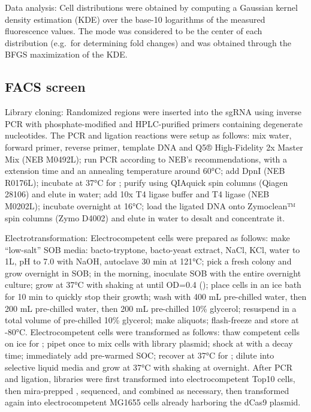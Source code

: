 \documentclass[10pt,oneside]{article}
\begin{document}
Data analysis: Cell distributions were obtained by computing a Gaussian kernel 
density estimation (KDE) over the base-10 logarithms of the measured 
fluorescence values.  The mode was considered to be the center of each 
distribution (e.g.\ for determining fold changes) and was obtained through the 
BFGS maximization of the KDE.

\subsection{FACS screen}

Library cloning: Randomized regions were inserted into the sgRNA using inverse 
PCR with phosphate-modified and HPLC-purified primers containing degenerate 
nucleotides.  The PCR and ligation reactions were setup as follows: mix 
 water,   forward primer,   reverse 
primer,   template DNA and  Q5® High-Fidelity 2x 
Master Mix (NEB M0492L); run PCR according to NEB's recommendations, with a 
 extension time and an annealing temperature around 60°C; add  
 DpnI (NEB R0176L); incubate at 37°C for ; purify using QIAquick 
spin columns (Qiagen 28106) and elute in  water; add  10x T4 
ligase buffer and   T4 ligase (NEB M0202L); incubate overnight 
at 16°C; load the ligated DNA onto Zymoclean™ spin columns (Zymo D4002) and 
elute in  water to desalt and concentrate it.

Electrotransformation: Electrocompetent cells were prepared as follows: make 
``low-salt'' SOB media:  bacto-tryptone,  bacto-yeast extract, 
  NaCl,   KCl, water to 1L, pH to 7.0 with 
NaOH, autoclave 30 min at 121°C; pick a fresh colony and grow overnight in 
 SOB; in the morning, inoculate  SOB with the entire overnight 
culture; grow at 37°C with shaking at  until OD=0.4 (); place 
cells in an ice bath for 10 min to quickly stop their growth; wash with 400 mL 
pre-chilled water, then 200 mL pre-chilled water, then 200 mL pre-chilled 10\% 
glycerol; resuspend in a total volume of  pre-chilled 10\% glycerol; make 
 aliquots; flash-freeze and store at -80°C.  Electrocompetent cells 
were transformed as follows: thaw competent cells on ice for ; pipet 
once to mix cells with   library plasmid; shock at 
with a  decay time; immediately add  pre-warmed SOC; recover at 
37°C for ; dilute into selective liquid media and grow at 37°C with 
shaking at  overnight.  After PCR and ligation, libraries were first 
transformed into electrocompetent Top10 cells, then mira-prepped 
\autocite{pronobis2016}, sequenced, and combined as necessary, then transformed 
again into electrocompetent MG1655 cells already harboring the dCas9 plasmid.
\end{document}
